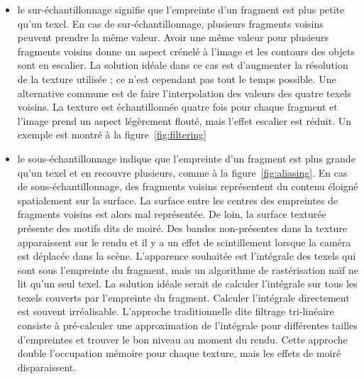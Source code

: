 \begin{itemize}
    \item le sur-échantillonnage signifie que l'empreinte d'un fragment est plus petite qu'un texel. En cas de sur-échantillonnage, plusieurs fragments voisins peuvent prendre la même valeur. Avoir une même valeur pour plusieurs fragments voisins donne un aspect crénelé à l'image et les contours des objets sont en escalier. La solution idéale dans ce cas est d'augmenter la résolution de la texture utilisée ; ce n'est cependant pas tout le temps possible. Une alternative commune est de faire l'interpolation des valeurs des quatre texels voisins. La texture est échantillonnée quatre fois pour chaque fragment et l'image prend un aspect légèrement flouté, mais l'effet escalier est réduit. Un exemple est montré à la figure~\ref{fig:filtering}
    \item le sous-échantillonnage indique que l'empreinte d'un fragment est plus grande qu'un texel et en recouvre plusieurs, comme à la figure~\ref{fig:aliasing}. En cas de sous-échantillonnage, des fragments voisins représentent du contenu éloigné spatialement sur la surface. La surface entre les centres des empreintes de fragments voisins est alors mal représentée. De loin, la surface texturée présente des motifs dits de moiré. Des bandes non-présentes dans la texture apparaissent sur le rendu et il y a un effet de scintillement lorsque la caméra est déplacée dans la scène. L'apparence souhaitée est l'intégrale des texels qui sont sous l'empreinte du fragment, mais un algorithme de rastérisation naïf ne lit qu'un seul texel. La solution idéale serait de calculer l'intégrale sur tous les texels couverts par l'empreinte du fragment. Calculer l'intégrale directement est souvent irréalisable. L'approche traditionnelle dite filtrage tri-linéaire consiste à pré-calculer une approximation de l'intégrale pour différentes tailles d'empreintes et trouver le bon niveau au moment du rendu. Cette approche double l'occupation mémoire pour chaque texture, mais les effets de moiré disparaissent.

\end{itemize}

